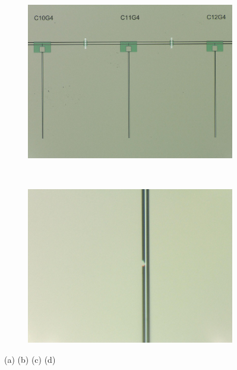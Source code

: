 \begin{figure}[h!!!!!!!!!!!!!!]
\begin{subfigure}[t]{0.48
    \textwidth}
        \includegraphics[width=\textwidth]{figures/ch4_design/chip11_21.jpg}
        \caption{}
        \label{fig:ch3_grVStlsgeochange}
    \end{subfigure}
    ~ 
    \begin{subfigure}[t]{0.48\textwidth}
        \includegraphics[width=\textwidth]{figures/ch4_design/chip11_G8.jpg}
        \caption{}
        \label{fig:ch3_grVStlsreadPchange}
    \end{subfigure}
    \caption{(a)  (b) (c) (d) }
    \label{fig:AreaVsFreq}
\end{figure}